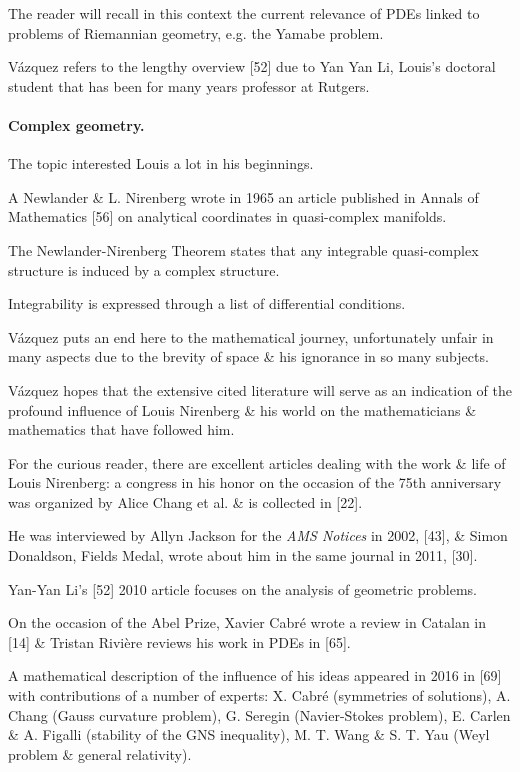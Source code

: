 \documentclass{article}
\begin{document}
The reader will recall in this context the current relevance of PDEs linked to problems of Riemannian geometry, e.g. the Yamabe problem.

V\'azquez refers to the lengthy overview [52] due to Yan Yan Li, Louis's doctoral student that has been for many years professor at Rutgers.

\paragraph{Complex geometry.} The topic interested Louis a lot in his beginnings.

A Newlander \& L. Nirenberg wrote in 1965 an article published in Annals of Mathematics [56] on analytical coordinates in quasi-complex manifolds.

The Newlander-Nirenberg Theorem states that any integrable quasi-complex structure is induced by a complex structure.

Integrability is expressed through a list of differential conditions.

%
V\'azquez puts an end here to the mathematical journey, unfortunately unfair in many aspects due to the brevity of space \& his ignorance in so many subjects.

V\'azquez hopes that the extensive cited literature will serve as an indication of the profound influence of Louis Nirenberg \& his world on the mathematicians \& mathematics that have followed him.

For the curious reader, there are excellent articles dealing with the work \& life of Louis Nirenberg: a congress in his honor on the occasion of the 75th anniversary was organized by Alice Chang et al. \& is collected in [22].

He was interviewed by Allyn Jackson for the \textit{AMS Notices} in 2002, [43], \& Simon Donaldson, Fields Medal, wrote about him in the same journal in 2011, [30].

Yan-Yan Li's [52] 2010 article focuses on the analysis of geometric problems.

On the occasion of the Abel Prize, Xavier Cabré wrote a review in Catalan in [14] \& Tristan Rivi\`ere reviews his work in PDEs in [65].

A mathematical description of the influence of his ideas appeared in 2016 in [69] with contributions of a number of experts: X. Cabr\'e (symmetries of solutions), A. Chang (Gauss curvature problem), G. Seregin (Navier-Stokes problem), E. Carlen \& A. Figalli (stability of the GNS inequality), M. T. Wang \& S. T. Yau (Weyl problem \& general relativity).
\end{document}
